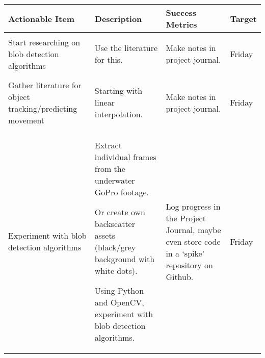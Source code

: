 \pagebreak
\begin{table}[!h]
    \centering
    \begin{tabularx}{\textwidth}{|X|X|X|l|}
        \hline
        Actionable Item & Description & Success Metrics & Target \\
        \hline
        \hline
        Start researching on blob detection algorithms &
        \begin{myitemize}
            \item Use the literature for this.
        \end{myitemize} &
        \begin{myitemize}
            \item Make notes in project journal.
        \end{myitemize} &
        Friday \\
        \hline
        Gather literature for object tracking/predicting movement &
        \begin{myitemize}
            \item Starting with linear interpolation.
        \end{myitemize} &
        \begin{myitemize}
            \item Make notes in project journal.
        \end{myitemize} &
        Friday \\
        \hline
        Experiment with blob detection algorithms &
        \begin{myitemize}
            \item Extract individual frames from the underwater GoPro footage.
            \item Or create own backscatter assets (black/grey background with white dots).
            \item Using Python and OpenCV, experiment with blob detection algorithms.
        \end{myitemize} &
        \begin{myitemize}
            \item Log progress in the Project Journal, maybe even store code in a `spike' repository on Github.
        \end{myitemize} &
        Friday \\
        \hline
    \end{tabularx}
\end{table}
